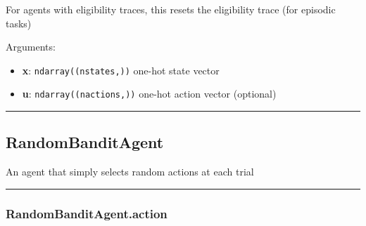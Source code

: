 \begin{Shaded}
\begin{Highlighting}[]
\OperatorTok{=}\NormalTok{)}
\end{Highlighting}
\end{Shaded}

For agents with eligibility traces, this resets the eligibility trace
(for episodic tasks)

Arguments:

\begin{itemize}
\tightlist
\item
  \textbf{x}: \texttt{ndarray((nstates,))} one-hot state vector
\item
  \textbf{u}: \texttt{ndarray((nactions,))} one-hot action vector
  (optional)
\end{itemize}

\begin{center}\rule{0.5\linewidth}{\linethickness}\end{center}

\hypertarget{randombanditagent}{%
\subsection{RandomBanditAgent}\label{randombanditagent}}

\begin{Shaded}
\begin{Highlighting}[]
\end{Highlighting}
\end{Shaded}

An agent that simply selects random actions at each trial

\begin{center}\rule{0.5\linewidth}{\linethickness}\end{center}

\hypertarget{randombanditagent.action}{%
\subsubsection{RandomBanditAgent.action}\label{randombanditagent.action}}

\begin{Shaded}
\begin{Highlighting}[]
\end{Highlighting}
\end{Shaded}

